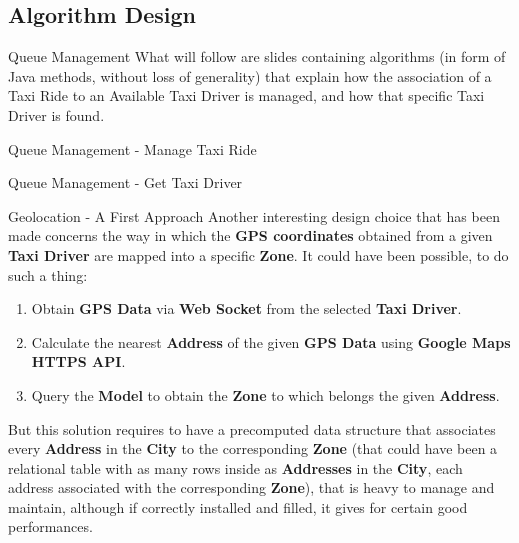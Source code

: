\documentclass{../common/latex_classes/pdf_presentation}
\begin{document}
	\subsection{Algorithm Design}
	\configureJava{}
	\begin{frame}{Queue Management}
		What will follow are slides containing algorithms (in form of Java methods, without loss of generality) that explain how the association of a Taxi Ride to an Available Taxi Driver is managed, and how that specific Taxi Driver is found.
	\end{frame}
	\begin{frame}{Queue Management - Manage Taxi Ride}	
		
	\end{frame}
	\begin{frame}{Queue Management - Get Taxi Driver}
		
	\end{frame}
	\begin{frame}{Geolocation - A First Approach}
		Another interesting design choice that has been made concerns the way in which the \textbf{GPS coordinates} obtained from a given \textbf{Taxi Driver} are mapped into a specific \textbf{Zone}.
		It could have been possible, to do such a thing:
		\begin{enumerate}
			\item Obtain \textbf{GPS Data} via \textbf{Web Socket} from the selected \textbf{Taxi Driver}.
			\item Calculate the nearest \textbf{Address} of the given \textbf{GPS Data} using \textbf{Google Maps HTTPS API}.
			\item Query the \textbf{Model} to obtain the \textbf{Zone} to which belongs the given \textbf{Address}.
		\end{enumerate}
		But this solution requires to have a precomputed data structure that associates every \textbf{Address} in the \textbf{City} to the corresponding \textbf{Zone} (that could have been a relational table with as many rows inside as \textbf{Addresses} in the \textbf{City}, each address associated with the corresponding \textbf{Zone}), that is heavy to manage and maintain, although if correctly installed and filled, it gives for certain good performances.
	\end{frame}
\end{document}
